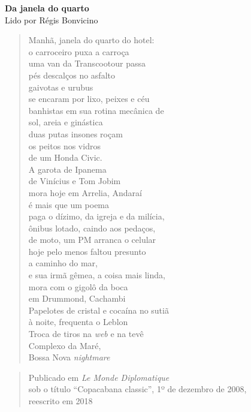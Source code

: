 \pagebreak

\textbf{Da janela do quarto}\\
Lido por Régis Bonvicino

\begin{verse}
Manhã, janela do quarto do hotel:\\
o carroceiro puxa a carroça\\
uma van da Transcootour passa\\
pés descalços no asfalto\\[5pt]
gaivotas e urubus\\
se encaram por lixo, peixes e céu\\
banhistas em sua rotina mecânica de\\
sol, areia e ginástica\\[5pt]
duas putas insones roçam\\
os peitos nos vidros\\
de um Honda Civic.\\
A garota de Ipanema\\[5pt]
de Vinícius e Tom Jobim\\
mora hoje em Arrelia, Andaraí\\
é mais que um poema\\
paga o dízimo, da igreja e da milícia,\\[5pt]
ônibus lotado, caindo aos pedaços,\\
de moto, um PM arranca o celular\\
hoje pelo menos faltou presunto\\
a caminho do mar,\\[5pt]
e sua irmã gêmea, a coisa mais linda,\\
mora com o gigolô da boca\\
em Drummond, Cachambi\\
Papelotes de cristal e cocaína no sutiã\\[5pt]
à noite, frequenta o Leblon\\
Troca de tiros na \emph{web} e na tevê\\
Complexo da Maré,\\
Bossa Nova \emph{nightmare}
\end{verse}

\begin{quote}
Publicado em \emph{Le Monde Diplomatique}\\
sob o título ``Copacabana classic'', 1º de dezembro de 2008,\\
reescrito em 2018
\end{quote}

